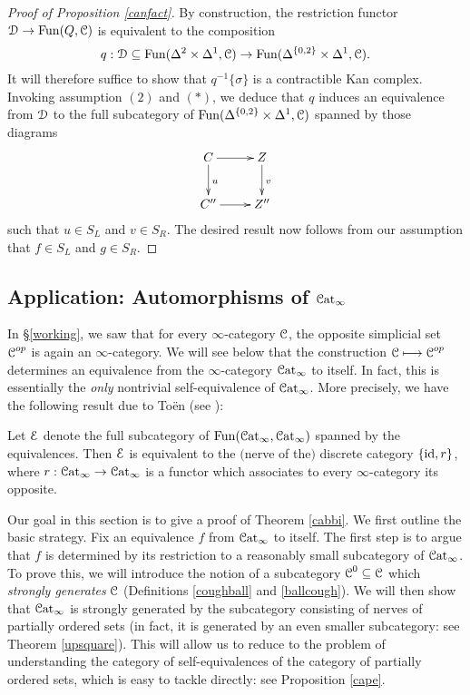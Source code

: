 \begin{proof}[Proof of Proposition \ref{canfact}]
By construction, the restriction functor $\operatorname{\mathcal{D}} \rightarrow \operatorname{Fun}(Q, \operatorname{\mathcal{C}})$ is equivalent to the composition
$$ q: \operatorname{\mathcal{D}} \subseteq \operatorname{Fun}( \Delta^2 \times \Delta^1, \operatorname{\mathcal{C}}) \rightarrow
\operatorname{Fun}( \Delta^{ \{0,2\} } \times \Delta^1, \operatorname{\mathcal{C}}).$$
It will therefore suffice to show that $q^{-1} \{ \sigma \}$ is a contractible Kan complex.
Invoking assumption $(2)$ and $(\ast)$, we deduce that $q$ induces an equivalence from
$\operatorname{\mathcal{D}}$ to the full subcategory of $\operatorname{Fun}( \Delta^{ \{0,2\} } \times \Delta^1, \operatorname{\mathcal{C}})$ spanned by
those diagrams
$$ \xymatrix{ C \ar[d]^{u} \ar[r] & Z \ar[d]^{v} \\
C'' \ar[r] & Z'' }$$
such that $u \in S_L$ and $v \in S_R$. The desired result now follows from our assumption that
$f \in S_L$ and $g \in S_R$.
\end{proof}

\subsection{Application: Automorphisms of $\operatorname{\mathcal{C}at}_{\infty}$}\label{cataut}

In \S \ref{working}, we saw that for every $\infty$-category $\operatorname{\mathcal{C}}$, the opposite simplicial set
$\operatorname{\mathcal{C}}^{op}$ is again an $\infty$-category. We will see below that the construction
$\operatorname{\mathcal{C}} \longmapsto \operatorname{\mathcal{C}}^{op}$ determines an equivalence from the $\infty$-category
$\operatorname{\mathcal{C}at}_{\infty}$ to itself. In fact, this is essentially the {\em only} nontrivial self-equivalence of
$\operatorname{\mathcal{C}at}_{\infty}$. More precisely, we have the following result due to To\"{e}n (see \cite{toenchar}):

\begin{theorem}\label{cabbi}
Let $\operatorname{\mathcal{E}}$ denote the full subcategory of $\operatorname{Fun}( \operatorname{\mathcal{C}at}_{\infty}, \operatorname{\mathcal{C}at}_{\infty})$ spanned by the equivalences. Then $\operatorname{\mathcal{E}}$ is equivalent to the $($nerve of the$)$ discrete category
$\{ \operatorname{id}, r \}$, where $r: \operatorname{\mathcal{C}at}_{\infty} \rightarrow \operatorname{\mathcal{C}at}_{\infty}$ is a functor which associates to every
$\infty$-category its opposite. 
\end{theorem}

Our goal in this section is to give a proof of Theorem \ref{cabbi}. We first outline the basic strategy. Fix an equivalence $f$ from $\operatorname{\mathcal{C}at}_{\infty}$ to itself. The first step is to argue that $f$ is determined by its restriction to a reasonably small subcategory of $\operatorname{\mathcal{C}at}_{\infty}$. To prove this, we will introduce the notion of a subcategory $\operatorname{\mathcal{C}}^{0} \subseteq \operatorname{\mathcal{C}}$ which {\it strongly generates} $\operatorname{\mathcal{C}}$
(Definitions \ref{coughball} and \ref{ballcough}). We will then show that $\operatorname{\mathcal{C}at}_{\infty}$ is strongly generated by the subcategory consisting of nerves of partially ordered sets (in fact, it is generated
by an even smaller subcategory: see Theorem \ref{upsquare}). This will allow us to reduce to the problem of understanding the category of self-equivalences of the category of partially ordered sets, which is easy to tackle directly: see Proposition \ref{cape}. 

